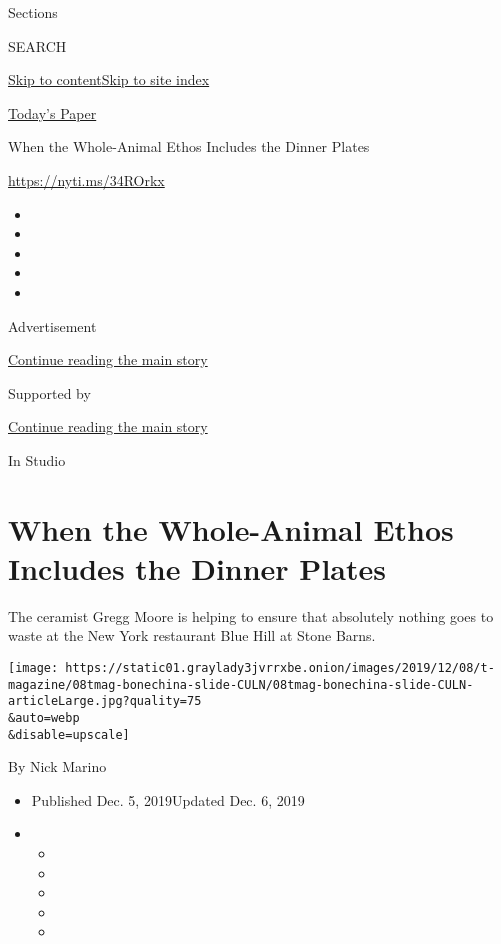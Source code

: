 Sections

SEARCH

\protect\hyperlink{site-content}{Skip to
content}\protect\hyperlink{site-index}{Skip to site index}

\href{https://myaccount.nytimes3xbfgragh.onion/auth/login?response_type=cookie\&client_id=vi}{}

\href{https://www.nytimes3xbfgragh.onion/section/todayspaper}{Today's
Paper}

When the Whole-Animal Ethos Includes the Dinner Plates

\url{https://nyti.ms/34ROrkx}

\begin{itemize}
\item
\item
\item
\item
\item
\end{itemize}

Advertisement

\protect\hyperlink{after-top}{Continue reading the main story}

Supported by

\protect\hyperlink{after-sponsor}{Continue reading the main story}

In Studio

\hypertarget{when-the-whole-animal-ethos-includes-the-dinner-plates}{%
\section{When the Whole-Animal Ethos Includes the Dinner
Plates}\label{when-the-whole-animal-ethos-includes-the-dinner-plates}}

The ceramist Gregg Moore is helping to ensure that absolutely nothing
goes to waste at the New York restaurant Blue Hill at Stone Barns.

\texttt{[image: https://static01.graylady3jvrrxbe.onion/images/2019/12/08/t-magazine/08tmag-bonechina-slide-CULN/08tmag-bonechina-slide-CULN-articleLarge.jpg?quality=75\\\&auto=webp\\\&disable=upscale]}

By Nick Marino

\begin{itemize}
\item
  Published Dec. 5, 2019Updated Dec. 6, 2019
\item
  \begin{itemize}
  \item
  \item
  \item
  \item
  \item
  \end{itemize}
\end{itemize}

